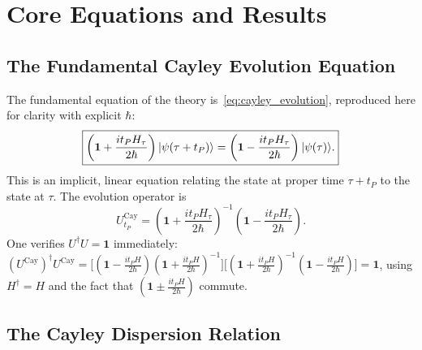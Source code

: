 \documentclass[12pt,a4paper]{article}
\begin{document}
\section{Core Equations and Results}
\label{sec:equations}

\subsection{The Fundamental Cayley Evolution Equation}
\label{sec:cayley_eq}

The fundamental equation of the theory is~\eqref{eq:cayley_evolution}, reproduced here
for clarity with explicit $\hbar$:
\begin{equation}
  \boxed{%
  \left(\mathbf{1} + \frac{i t_P H_\tau}{2\hbar}\right)|\psi(\tau + t_P)\rangle
  = \left(\mathbf{1} - \frac{i t_P H_\tau}{2\hbar}\right)|\psi(\tau)\rangle.
  }
  \label{eq:fundamental}
\end{equation}
This is an implicit, linear equation relating the state at proper time $\tau + t_P$ to
the state at $\tau$.  The evolution operator is
\begin{equation}
  U_{t_P}^{\mathrm{Cay}} = \left(\mathbf{1} + \frac{it_P H_\tau}{2\hbar}\right)^{-1}
                            \left(\mathbf{1} - \frac{it_P H_\tau}{2\hbar}\right).
  \label{eq:cayley_operator}
\end{equation}
One verifies $U^\dagger U = \mathbf{1}$ immediately:
$(U^{\mathrm{Cay}})^\dagger U^{\mathrm{Cay}}
  = \bigl[(\mathbf{1} - \frac{it_P H}{2\hbar})(\mathbf{1} + \frac{it_P H}{2\hbar})^{-1}\bigr]
    \bigl[(\mathbf{1} + \frac{it_P H}{2\hbar})^{-1}(\mathbf{1} - \frac{it_P H}{2\hbar})\bigr]
  = \mathbf{1}$,
using $H^\dagger = H$ and the fact that $(\mathbf{1} \pm \frac{it_P H}{2\hbar})$
commute.

\subsection{The Cayley Dispersion Relation}
\label{sec:dispersion}
\end{document}
